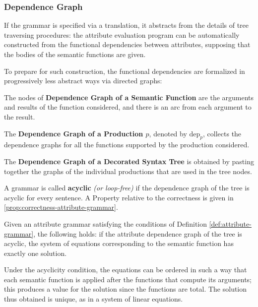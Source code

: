 \documentclass[english]{article}
\begin{document}
\subsubsection{Dependence Graph}

If the grammar is specified via a translation, it abstracts from the details of tree traversing procedures:
the attribute evaluation program can be automatically constructed from the functional dependencies between attributes, supposing that the bodies of the semantic functions are given.

To prepare for such construction, the functional dependencies are formalized in progressively less abstract ways via directed graphs:

\begin{definition}
  The nodes of \textbf{Dependence Graph of a Semantic Function} are the arguments and results of the function considered, and there is an arc from each argument to the result.
\end{definition}
\begin{definition}
  The \textbf{Dependence Graph of a Production \(p\)}, denoted by \(\text{dep}_p\), collects the dependence graphs for all the functions supported by the production considered.
\end{definition}
\begin{definition}
  The \textbf{Dependence Graph of a Decorated Syntax Tree} is obtained by pasting together the graphs of the individual productions that are used in the tree nodes.
\end{definition}

A grammar is called \textbf{acyclic} \textit{(or loop-free)} if the dependence graph of the tree is acyclic for every sentence.
A Property relative to the correctness is given in \ref{prop:correctness-attribute-grammar}.

\begin{property}
  \label{prop:correctness-attribute-grammar}
  Given an attribute grammar satisfying the conditions of Definition \ref{def:attribute-grammar}, the following holds:
  if the attribute dependence graph of the tree is acyclic, the system of equations corresponding to the semantic function has exactly one solution.
\end{property}

Under the acyclicity condition, the equations can be ordered in such a way that each semantic function is applied after the functions that compute its arguments;
this produces a value for the solution since the functions are total.
The solution thus obtained is unique, as in a system of linear equations.
\end{document}
